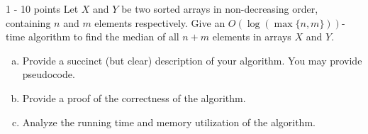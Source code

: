 \documentclass{common/cs157}
\begin{document}
\midtermpolicyremind{}

\begin{problem}{1 - 10 points}
Let $X$ and $Y$ be two sorted arrays in non-decreasing order, containing $n$ and $m$ elements respectively. Give an $O(\log(\max\{n,m\}))$-time algorithm to find the median of all $n+m$ elements in arrays $X$ and $Y$. 
\begin{enumerate}[(a)]
    \item Provide a succinct (but clear) description of your algorithm. You may provide pseudocode.
    \item Provide a proof of the correctness of the algorithm.
    \item Analyze the running time and memory utilization of the algorithm.
\end{enumerate}
\end{problem}

\newpage
\end{document}
